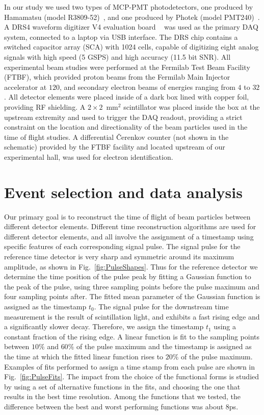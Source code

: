 In our study we used two types of MCP-PMT photodetectors, one produced by Hamamatsu 
(model R3809-52)~\cite{HamamatsuMCP3809}, and one produced by Photek (model
PMT240)~\cite{Photek240}. A DRS4  waveform digitizer V4 evaluation
board ~\cite{DRS4} was used as the primary DAQ system, connected to a laptop via
USB interface.  The DRS chip contains a switched capacitor array (SCA) with 1024 cells, 
capable of digitizing eight analog signals with high speed (5 GSPS) and high 
accuracy (11.5 bit SNR). All experimental beam studies were performed at the Fermilab Test
Beam Facility (FTBF), which provided proton beams from the Fermilab Main
Injector accelerator at $120$\GeV, and secondary electron beams of energies
ranging from $4$ to $32$\GeV. All detector elements were placed inside of a dark box
lined with copper foil, providing RF shielding. A $2\times2$~$\mathrm{mm}^{2}$
scintillator was placed inside the box at the upstream extremity and used to
trigger the DAQ readout, providing a strict constraint on the
location and directionality of the beam particles used in the time of flight
studies. A differential \v{C}erenkov counter (not shown in the schematic) provided by the FTBF
facility and located upstream of our experimental hall, was used for electron
identification. 

\section{Event selection and data analysis}

Our primary goal is to reconstruct the time of flight of beam particles between
different detector elements. Different time reconstruction algorithms are used
for different detector elements, and all involve the assignment of a timestamp
using specific features of each corresponding signal pulse. The signal pulse for
the reference time detector is very sharp and symmetric around its maximum
amplitude, as shown in Fig.~\ref{fig:PulseShapes}. Thus for the reference
detector we determine the time position of the pulse peak by fitting a
Gaussian function to the peak of the pulse, using three sampling points before the pulse
maximum and four sampling points after. The fitted mean parameter of the
Gaussian function is assigned as the timestamp $t_{0}$. The signal pulse for the
downstream time measurement is the result of scintillation light, and exhibits a
fast rising edge and a significantly slower decay. Therefore, we assign the
timestamp $t_{1}$ using a constant fraction of the rising edge. A linear
function is fit to the sampling points between $10\%$ and $60\%$ of the pulse
maximum and the timestamp is assigned as the time at which the fitted linear
function rises to $20\%$ of the pulse maximum. Examples of fits performed to
assign a time stamp from each pulse are shown in Fig.~\ref{fig:PulseFits}. The
impact from the choice of the functional forms is studied by using a set of
alternative functions in the fits, and choosing the one that results in the best
time resolution. Among the functions that we tested, the difference between the
best and worst performing functions was about 8\unit{ps}.

